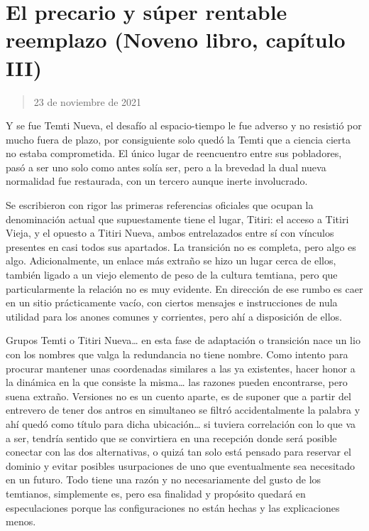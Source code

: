 \documentclass[
]{book}
\begin{document}
\hypertarget{el-precario-y-suxfaper-rentable-reemplazo-noveno-libro-capuxedtulo-iii}{%
\section{El precario y súper rentable reemplazo (Noveno libro, capítulo III)}\label{el-precario-y-suxfaper-rentable-reemplazo-noveno-libro-capuxedtulo-iii}}

\begin{quote}
23 de noviembre de 2021
\end{quote}

Y se fue Temti Nueva, el desafío al espacio-tiempo le fue adverso y no resistió por mucho fuera de plazo, por consiguiente solo quedó la Temti que a ciencia cierta no estaba comprometida. El único lugar de reencuentro entre sus pobladores, pasó a ser uno solo como antes solía ser, pero a la brevedad la dual nueva normalidad fue restaurada, con un tercero aunque inerte involucrado.

Se escribieron con rigor las primeras referencias oficiales que ocupan la denominación actual que supuestamente tiene el lugar, Titiri: el acceso a Titiri Vieja, y el opuesto a Titiri Nueva, ambos entrelazados entre sí con vínculos presentes en casi todos sus apartados. La transición no es completa, pero algo es algo. Adicionalmente, un enlace más extraño se hizo un lugar cerca de ellos, también ligado a un viejo elemento de peso de la cultura temtiana, pero que particularmente la relación no es muy evidente. En dirección de ese rumbo es caer en un sitio prácticamente vacío, con ciertos mensajes e instrucciones de nula utilidad para los anones comunes y corrientes, pero ahí a disposición de ellos.

Grupos Temti o Titiri Nueva\ldots{} en esta fase de adaptación o transición nace un lio con los nombres que valga la redundancia no tiene nombre. Como intento para procurar mantener unas coordenadas similares a las ya existentes, hacer honor a la dinámica en la que consiste la misma\ldots{} las razones pueden encontrarse, pero suena extraño. Versiones no es un cuento aparte, es de suponer que a partir del entrevero de tener dos antros en simultaneo se filtró accidentalmente la palabra y ahí quedó como título para dicha ubicación\ldots{} si tuviera correlación con lo que va a ser, tendría sentido que se convirtiera en una recepción donde será posible conectar con las dos alternativas, o quizá tan solo está pensado para reservar el dominio y evitar posibles usurpaciones de uno que eventualmente sea necesitado en un futuro. Todo tiene una razón y no necesariamente del gusto de los temtianos, simplemente es, pero esa finalidad y propósito quedará en especulaciones porque las configuraciones no están hechas y las explicaciones menos.
\end{document}
